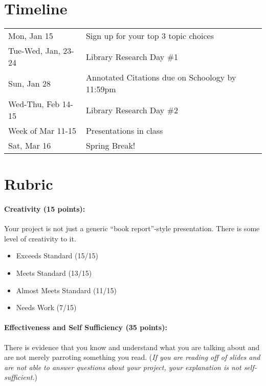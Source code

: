\documentclass[11pt]{exam}
\begin{document}
\section*{Timeline}

\begin{tabular}{ll}
  Mon, Jan 15 & 
  Sign up for your top 3 topic choices
  \\[1em]
  Tue-Wed, Jan, 23-24 & 
  Library Research Day \#1
  \\[1em]
  Sun, Jan 28 & 
  Annotated Citations due on Schoology by 11:59pm
  \\[1em]
  Wed-Thu, Feb 14-15 & 
  Library Research Day \#2
  \\[1em]
  Week of Mar 11-15 & 
  Presentations in class
  \\[1em]
  Sat, Mar 16 &
  Spring Break!
\end{tabular}


\pagebreak



\section*{Rubric}

\paragraph{Creativity (15 points):} 
  Your project is not just a generic ``book report''-style presentation.  There is some level of creativity to it.

\begin{itemize}
  \item Exceeds Standard (15/15)
  \item Meets Standard (13/15)
  \item Almost Meets Standard (11/15)
  \item Needs Work (7/15)
  
\end{itemize}




\paragraph{Effectiveness and Self Sufficiency (35 points):} 
  There is evidence that you know and understand what you are talking about and are not merely parroting something you read.  (\emph{If you are reading off of slides and are not able to answer questions about your project, your explanation is not self-sufficient.})
\end{document}
